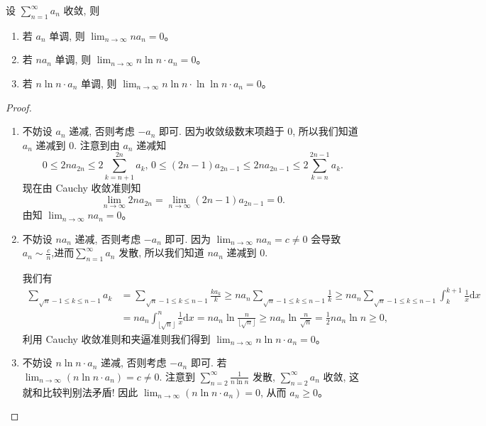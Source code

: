 \documentclass[../../main.tex]{subfiles}%
\begin{document}
\begin{proposition}\label{proposition:单调收敛级数的阶}
设 \( \sum_{n = 1}^{\infty} a_n \) 收敛, 则
\begin{enumerate}
\item 若 \( a_n \) 单调, 则 \( \lim_{n \to \infty} n a_n = 0 \)。

\item 若 \( n a_n \) 单调, 则 \( \lim_{n \to \infty} n \ln n \cdot a_n = 0 \)。

\item 若 \( n \ln n \cdot a_n \) 单调, 则 \( \lim_{n \to \infty} n \ln n \cdot \ln \ln n \cdot a_n = 0 \)。
\end{enumerate}
\end{proposition}
\begin{proof}
\begin{enumerate}
\item 不妨设 \( a_n \) 递减, 否则考虑 \( -a_n \) 即可. 因为收敛级数末项趋于 0, 所以我们知道 \( a_n \) 递减到 0. 注意到由 \( a_n \) 递减知
\[
0 \leqslant 2n a_{2n} \leqslant 2 \sum_{k = n + 1}^{2n} a_k, \, 0 \leqslant (2n - 1) a_{2n - 1} \leqslant 2n a_{2n - 1} \leqslant 2 \sum_{k = n}^{2n - 1} a_k.
\]
现在由 Cauchy 收敛准则知
\[
\lim_{n \to \infty} 2n a_{2n} = \lim_{n \to \infty} (2n - 1) a_{2n - 1} = 0.
\]
由知 \( \lim_{n \to \infty} n a_n = 0 \)。

\item 不妨设 \( n a_n \) 递减, 否则考虑 \( -a_n \) 即可. 因为 \( \lim_{n \to \infty} n a_n = c \neq 0 \) 会导致$a_n\sim \frac{c}{n}$,进而\( \sum_{n = 1}^{\infty} a_n \) 发散, 所以我们知道 \( n a_n \) 递减到 0.

我们有
\begin{align*}
\sum_{\sqrt{n} - 1 \leqslant k \leqslant n - 1} a_k &= \sum_{\sqrt{n} - 1 \leqslant k \leqslant n - 1} \frac{k a_k}{k} \geqslant n a_n \sum_{\sqrt{n} - 1 \leqslant k \leqslant n - 1} \frac{1}{k} \geqslant n a_n \sum_{\sqrt{n} - 1 \leqslant k \leqslant n - 1} \int_{k}^{k + 1} \frac{1}{x} \mathrm{d}x \\
&= n a_n \int_{\lfloor \sqrt{n} \rfloor}^{n} \frac{1}{x} \mathrm{d}x = n a_n \ln \frac{n}{\lfloor \sqrt{n} \rfloor} \geqslant n a_n \ln \frac{n}{\sqrt{n}} = \frac{1}{2} n a_n \ln n \geqslant 0,
\end{align*}
利用 Cauchy 收敛准则和夹逼准则我们得到 \( \lim_{n \to \infty} n \ln n \cdot a_n = 0 \)。

\item 不妨设 \( n \ln n \cdot a_n \) 递减, 否则考虑 \( -a_n \) 即可. 若 \( \lim_{n \to \infty} (n \ln n \cdot a_n) = c \neq 0 \). 注意到 \( \sum_{n = 2}^{\infty} \frac{1}{n \ln n} \) 发散, \( \sum_{n = 2}^{\infty} a_n \) 收敛, 这就和比较判别法矛盾! 因此 \( \lim_{n \to \infty} (n \ln n \cdot a_n) = 0 \), 从而 \( a_n \geqslant 0 \)。


\end{enumerate}
\end{proof}
\end{document}
